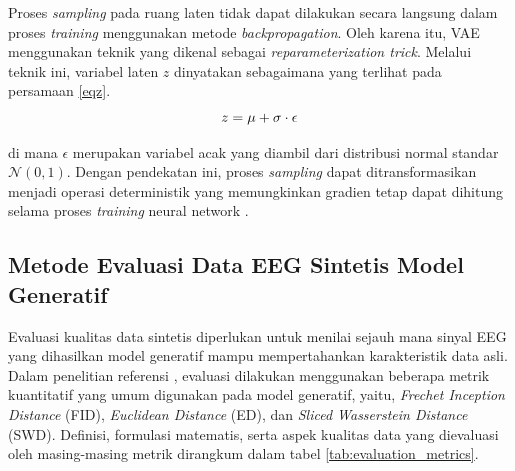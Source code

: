 Proses \textit{sampling} pada ruang laten tidak dapat dilakukan secara langsung dalam proses \textit{training} menggunakan metode \textit{backpropagation}. Oleh karena itu, VAE menggunakan teknik yang dikenal sebagai \textit{reparameterization trick}. Melalui teknik ini, variabel laten $z$ dinyatakan sebagaimana yang terlihat pada persamaan \ref{eqz}. 
\begin{equation}
z = \mu + \sigma \cdot \epsilon
\label{eqz}
\addcontentsline{equ}{equations}{\protect\numberline{\theequation}Metode Reparameterization}
\end{equation}

di mana $\epsilon$ merupakan variabel acak yang diambil dari distribusi normal standar $\mathcal{N}(0,1)$. Dengan pendekatan ini, proses \textit{sampling} dapat ditransformasikan menjadi operasi deterministik yang memungkinkan gradien tetap dapat dihitung selama proses \textit{training} neural network \cite{vae_original}.


\subsection{Metode Evaluasi Data EEG Sintetis Model Generatif}

Evaluasi kualitas data sintetis diperlukan untuk menilai sejauh mana sinyal EEG yang dihasilkan model generatif mampu mempertahankan karakteristik data asli. Dalam penelitian referensi \cite{eeg_gan}, evaluasi dilakukan menggunakan beberapa metrik kuantitatif yang umum digunakan pada model generatif, yaitu, \textit{Frechet Inception Distance} (FID), \textit{Euclidean Distance} (ED), dan \textit{Sliced Wasserstein Distance} (SWD). Definisi, formulasi matematis, serta aspek kualitas data yang dievaluasi oleh masing-masing metrik dirangkum dalam tabel \ref{tab:evaluation_metrics}.

